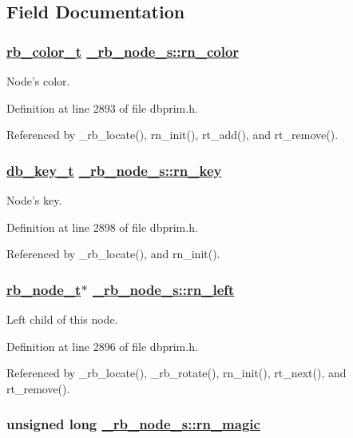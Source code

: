 \subsection{Field Documentation}
\hypertarget{struct__rb__node__s_o1}{
\subsubsection[rn\_\-color]{\setlength{\rightskip}{0pt plus 5cm}\hyperlink{group__dbprim__rbtree_ga4}{rb\_\-color\_\-t} \hyperlink{struct__rb__node__s_o1}{\_\-rb\_\-node\_\-s::rn\_\-color}}}
\label{struct__rb__node__s_o1}


Node's color. 

Definition at line 2893 of file dbprim.h.

Referenced by \_\-rb\_\-locate(), rn\_\-init(), rt\_\-add(), and rt\_\-remove().\hypertarget{struct__rb__node__s_o6}{
\subsubsection[rn\_\-key]{\setlength{\rightskip}{0pt plus 5cm}\hyperlink{struct__db__key__s}{db\_\-key\_\-t} \hyperlink{struct__rb__node__s_o6}{\_\-rb\_\-node\_\-s::rn\_\-key}}}
\label{struct__rb__node__s_o6}


Node's key. 

Definition at line 2898 of file dbprim.h.

Referenced by \_\-rb\_\-locate(), and rn\_\-init().\hypertarget{struct__rb__node__s_o4}{
\subsubsection[rn\_\-left]{\setlength{\rightskip}{0pt plus 5cm}\hyperlink{struct__rb__node__s}{rb\_\-node\_\-t}$\ast$ \hyperlink{struct__rb__node__s_o4}{\_\-rb\_\-node\_\-s::rn\_\-left}}}
\label{struct__rb__node__s_o4}


Left child of this node. 

Definition at line 2896 of file dbprim.h.

Referenced by \_\-rb\_\-locate(), \_\-rb\_\-rotate(), rn\_\-init(), rt\_\-next(), and rt\_\-remove().\hypertarget{struct__rb__node__s_o0}{
\subsubsection[rn\_\-magic]{\setlength{\rightskip}{0pt plus 5cm}unsigned long \hyperlink{struct__rb__node__s_o0}{\_\-rb\_\-node\_\-s::rn\_\-magic}}}
\label{struct__rb__node__s_o0}


